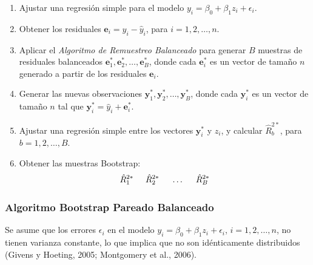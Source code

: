 \begin{enumerate}
	\item Ajustar una regresión simple para el modelo \( y_{i} = \beta_{0} + \beta_{1}z_{i} + \epsilon_{i} \).
	
	\item Obtener los residuales \( \mathbf{e}_{i} = y_{i} - \hat{y}_{i} \), para \( i = 1, 2, \dots, n \).
	
	\item Aplicar el \textit{Algoritmo de Remuestreo Balanceado} para generar \( B \) muestras de residuales balanceados \( \mathbf{e}^{*}_{1}, \mathbf{e}^{*}_{2}, \dots, \mathbf{e}^{*}_{B} \), donde cada \( \mathbf{e}^{*}_{i} \) es un vector de tamaño \( n \) generado a partir de los residuales \( \mathbf{e}_{i} \).
	
	\item Generar las nuevas observaciones \( \mathbf{y}^{*}_{1}, \mathbf{y}^{*}_{2}, \dots, \mathbf{y}^{*}_{B} \), donde cada \( \mathbf{y}^{*}_{i} \) es un vector de tamaño \( n \) tal que \( \mathbf{y}^{*}_{i} = \hat{y}_{i} + \mathbf{e}^{*}_{i} \).
	
	\item Ajustar una regresión simple entre los vectores \( \mathbf{y}^{*}_{i} \) y \( z_{i} \), y calcular \( \hat{R}^{2*}_{b} \), para \( b = 1, 2, \dots, B \).
	
	\item Obtener las muestras Bootstrap:
	\[
	\hat{R}^{2*}_{1} \hspace{.5cm} \hat{R}^{2*}_{2} \hspace{.5cm} \dots \hspace{.5cm} \hat{R}^{2*}_{B}
	\]
\end{enumerate}


\subsubsection{Algoritmo Bootstrap Pareado Balanceado}

Se asume que los errores \( \epsilon_{i} \) en el modelo 
\( y_{i} = \beta_{0} + \beta_{1}z_{i} + \epsilon_{i} \), \( i = 1, 2, \dots, n \), no tienen varianza constante, lo que implica que no son idénticamente distribuidos (Givens y Hoeting, 2005; Montgomery et al., 2006).

